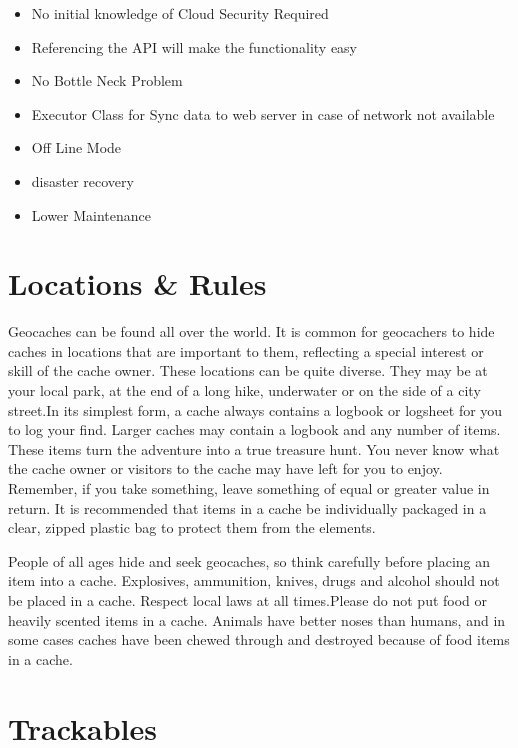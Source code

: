 	
	
	\begin{itemize}
	
	
	
	 \item No initial knowledge of Cloud Security Required
	\item Referencing the API will make the functionality easy
	\item  No Bottle Neck Problem 
	\item Executor Class for Sync data to web server in case of network not available
	\item Off Line Mode
	\item  disaster recovery
	\item Lower Maintenance  
	
	
	
	\end{itemize}
	
	
	
	
	\section{Locations & Rules }
	Geocaches can be found all over the world. It is common for geocachers to hide caches in locations that are important to them, reflecting a special interest or skill of the cache owner. These locations can be quite diverse. They may be at your local park, at the end of a long hike, underwater or on the side of a city street.In its simplest form, a cache always contains a logbook or logsheet for you to log your find. Larger caches may contain a logbook and any number of items. These items turn the adventure into a true treasure hunt. You never know what the cache owner or visitors to the cache may have left for you to enjoy. Remember, if you take something, leave something of equal or greater value in return. It is recommended that items in a cache be individually packaged in a clear, zipped plastic bag to protect them from the elements.
	
	People of all ages hide and seek geocaches, so think carefully before placing an item into a cache. Explosives, ammunition, knives, drugs and alcohol should not be placed in a cache. Respect local laws at all times.Please do not put food or heavily scented items in a cache. Animals have better noses than humans, and in some cases caches have been chewed through and destroyed because of food items in a cache.
	
	
	
	
	\section{Trackables}
	

